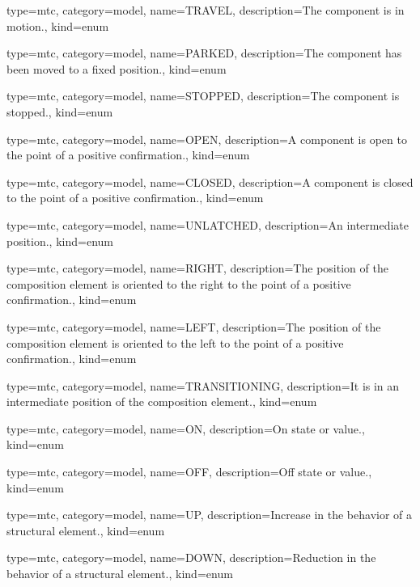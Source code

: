 {
  type=mtc,
  category=model,
  name={TRAVEL},
  description={The component is in motion.},
  kind={enum}
}


{
  type=mtc,
  category=model,
  name={PARKED},
  description={The component has been moved to a fixed position.},
  kind={enum}
}


{
  type=mtc,
  category=model,
  name={STOPPED},
  description={The component is stopped.},
  kind={enum}
}


{
  type=mtc,
  category=model,
  name={OPEN},
  description={A component is open to the point of a positive confirmation.},
  kind={enum}
}


{
  type=mtc,
  category=model,
  name={CLOSED},
  description={A component is closed to the point of a positive confirmation.},
  kind={enum}
}


{
  type=mtc,
  category=model,
  name={UNLATCHED},
  description={An intermediate position.},
  kind={enum}
}


{
  type=mtc,
  category=model,
  name={RIGHT},
  description={The position of the \gls{composition} element is oriented to the right to the point of a positive confirmation.},
  kind={enum}
}


{
  type=mtc,
  category=model,
  name={LEFT},
  description={The position of the \gls{composition} element is oriented to the left to the point of a positive confirmation.},
  kind={enum}
}


{
  type=mtc,
  category=model,
  name={TRANSITIONING},
  description={It is in an intermediate position of the \gls{composition} element.},
  kind={enum}
}


{
  type=mtc,
  category=model,
  name={ON},
  description={On state or value.},
  kind={enum}
}


{
  type=mtc,
  category=model,
  name={OFF},
  description={Off state or value.},
  kind={enum}
}


{
  type=mtc,
  category=model,
  name={UP},
  description={Increase in the behavior of a \gls{structural element}.},
  kind={enum}
}


{
  type=mtc,
  category=model,
  name={DOWN},
  description={Reduction in the behavior of a \gls{structural element}.},
  kind={enum}
}


